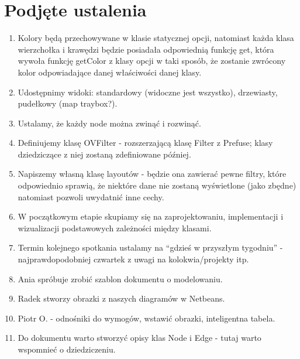 \documentclass[a4paper,10pt]{article}
\begin{document}
\section{Podjęte ustalenia}
\begin{enumerate}
\item Kolory będą przechowywane w klasie statycznej opcji, natomiast każda klasa wierzchołka i krawędzi będzie posiadała odpowiednią funkcję get, która wywoła funkcję getColor z klasy opcji w taki sposób, że zostanie zwrócony kolor odpowiadające danej właściwości danej klasy. 
\item Udostępnimy widoki: standardowy (widoczne jest wszystko), drzewiasty, pudełkowy (map traybox?).
\item Ustalamy, że każdy node można zwinąć i rozwinąć.
\item Definiujemy klasę OVFilter - rozszerzającą klasę Filter z Prefuse; klasy dziedziczące z niej zostaną zdefiniowane później.
\item Napiszemy własną klasę layoutów - będzie ona zawierać pewne filtry, które odpowiednio sprawią, że niektóre dane nie zostaną wyświetlone (jako zbędne) natomiast pozwoli uwydatnić inne cechy.
\item W początkowym etapie skupiamy się na zaprojektowaniu, implementacji i wizualizacji podstawowych zależności między klasami.
\item Termin kolejnego spotkania ustalamy na ``gdzieś w przyszłym tygodniu'' - najprawdopodobniej czwartek z uwagi na kolokwia/projekty itp.
\item Ania spróbuje zrobić szablon dokumentu o modelowaniu.
\item Radek stworzy obrazki z naszych diagramów w Netbeans.
\item Piotr O. - odnośniki do wymogów, wstawić obrazki, inteligentna tabela.
\item Do dokumentu warto stworzyć opisy klas Node i Edge - tutaj warto wspomnieć o dziedziczeniu.
\end{enumerate}
\end{document}
